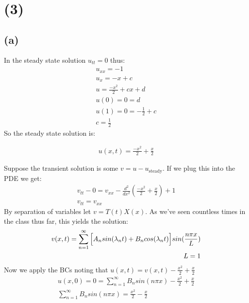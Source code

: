 \documentclass{article}
\begin{document}
\section*{\textbf{(3)}}
\subsection*{\textbf{(a)}}
In the steady state solution $u_{tt} = 0$ thus:
\begin{equation}
\begin{aligned}
u_{xx} = - 1\\
u_x = -x + c\\
u = \frac{-x^2}{2} + cx + d\\
u(0)= 0 = d\\
u(1) = 0 = -\frac{1}{2} + c\\
c = \frac{1}{2}
\end{aligned}
\end{equation}
So the steady state solution is:
\begin{tcolorbox}[minipage,colback=white,arc=0pt,outer arc=0pt]
\begin{equation}
\begin{aligned}
u(x,t)  = \frac{-x^2}{2} + \frac{x}{2}
\end{aligned}
\end{equation}
\end{tcolorbox}
Suppose the transient solution is some $v = u - u_{\text{steady}}$. If we plug this into the PDE we get:
\begin{equation}
\begin{aligned}
v_{tt} - 0 = v_{xx} - \frac{d^2}{dx^2}(\frac{-x^2}{2} + \frac{x}{2}) + 1\\
v_{tt} = v_{xx}
\end{aligned}
\end{equation}
By separation of variables let $v=T(t)X(x)$. As we've seen countless times in the class thus far, this yields the solution:
\begin{equation}
\begin{aligned}
v(x,t) = \sum_{n=1}^{\infty} \Big{[}A_nsin(\lambda_n t) + B_ncos(\lambda_n t) \Big{]}sin(\frac{n\pi x}{L})\\
L = 1\\
\end{aligned}
\end{equation}
Now we apply the BCs noting that $u(x,t) = v(x,t) - \frac{x^2}{2} + \frac{x}{2}$\\
\begin{equation}
\begin{aligned}
u(x,0) = 0 = \sum_{n=1}^{\infty}B_nsin(n\pi x)- \frac{x^2}{2} + \frac{x}{2}\\
\sum_{n=1}^{\infty}B_nsin(n\pi x) = \frac{x^2}{2} - \frac{x}{2}\\
\end{aligned}
\end{equation}
\end{document}
